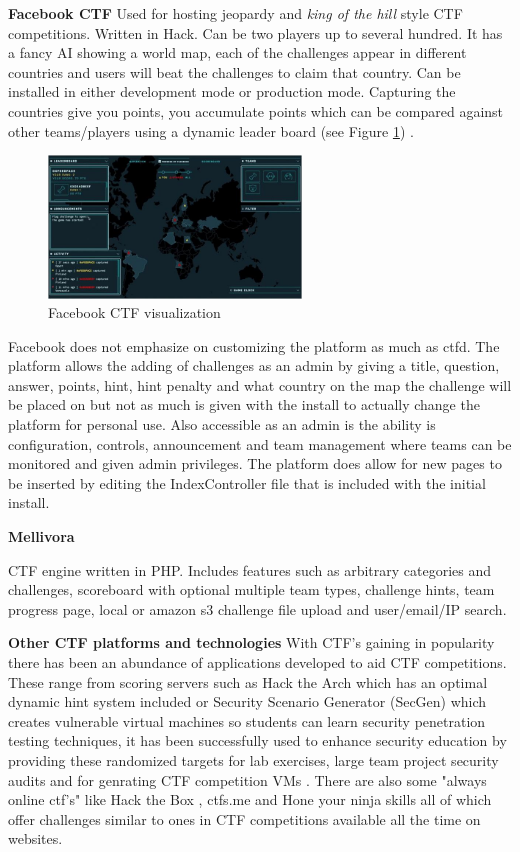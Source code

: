 \documentclass[12pt,a4paper]{article}
\begin{document}
\textbf{Facebook CTF} 
Used for hosting jeopardy and \emph{king of the hill} style CTF competitions. Written in Hack. Can be two players up to several hundred. It has a fancy AI showing a world map, each of the challenges appear in different countries and users will beat the challenges to claim that country. Can be installed in either development mode or production mode. Capturing the countries give you points, you accumulate points which can be compared against other teams/players using a dynamic leader board (see Figure \ref{fig:fig5}) \cite{fbctf}.  

\begin{figure}[h]
    \centering
    \includegraphics[width=0.6\textwidth]{Figs/fbctf.jpg} 
    \caption{Facebook CTF visualization}
    \label{fig:fig5}
\end{figure}   

Facebook does not emphasize on customizing the platform as much as ctfd. The platform allows the adding of challenges as an admin by giving a title, question, answer, points, hint, hint penalty and what country on the map the challenge will be placed on but not as much is given with the install to actually change the platform for personal use. Also accessible as an admin is the ability is configuration, controls, announcement and team management where teams can be monitored and given admin privileges. The platform does allow for new pages to be inserted by editing the IndexController file that is included with the initial install. 

\textbf{Mellivora} 

CTF engine written in PHP. Includes features such as arbitrary categories and challenges, scoreboard with optional multiple team types, challenge hints, team progress page, local or amazon s3 challenge file upload and user/email/IP search\cite{mellivora}.  

\textbf{Other CTF platforms and technologies}  
With CTF's gaining in popularity there has been an abundance of applications developed to aid CTF competitions. These range from scoring servers such as Hack the Arch \cite{HackTheArch} which has an optimal dynamic hint system included or Security Scenario Generator (SecGen)\cite{SecGen} which creates vulnerable virtual machines so students can learn security penetration testing techniques, it has been successfully used to enhance security education by providing these randomized targets for lab exercises, large team project security audits and for genrating CTF competition VMs \cite{schreuders2017security}. There are also some "always online ctf's" like Hack the Box \cite{HackTheBox}, ctfs.me \cite{ctfs} and Hone your ninja skills \cite{Ninja} all of which offer challenges similar to ones in CTF competitions available all the time on websites. 
\end{document}
